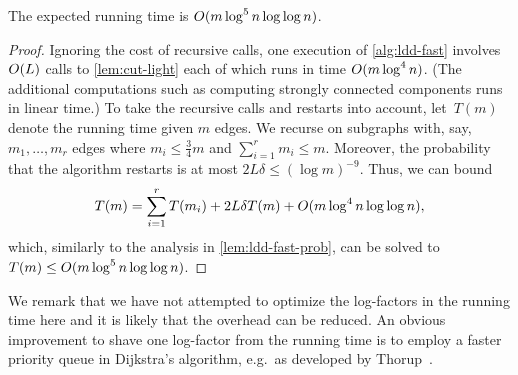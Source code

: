 \documentclass[letterpaper,11pt]{article}
\begin{document}
\begin{lemma} \label{lem:ldd-fast-time}
The expected running time is $O(m \log^5 n \log\log n)$.
\end{lemma}
\begin{proof}
Ignoring the cost of recursive calls, one execution of \cref{alg:ldd-fast} involves $O(L)$ calls to \cref{lem:cut-light} each of which runs in time $O(m \log^4 n)$. (The additional computations such as computing strongly connected components runs in linear time.) To take the recursive calls and restarts into account, let~$T(m)$ denote the running time given $m$ edges. We recurse on subgraphs with, say,~$m_1, \dots, m_r$ edges where $m_i \leq \frac34 m$ and $\sum_{i=1}^r m_i \leq m$. Moreover, the probability that the algorithm restarts is at most $2L \delta \leq (\log m)^{-9}$. Thus, we can bound
\begin{equation*}
    T(m) = \sum_{i=1}^r T(m_i) + 2L\delta T(m) + O(m \log^4 n \log\log n),
\end{equation*}
which, similarly to the analysis in \cref{lem:ldd-fast-prob}, can be solved to $T(m) \leq O(m \log^5 n \log\log n)$.
\end{proof}

We remark that we have not attempted to optimize the log-factors in the running time here and it is likely that the overhead can be reduced. An obvious improvement to shave one log-factor from the running time is to employ a faster priority queue in Dijkstra's algorithm, e.g.\ as developed by Thorup~\cite{Thorup03}. 

\end{document}
